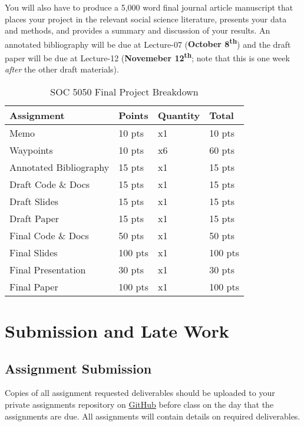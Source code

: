 \documentclass[]{book}
\theoremstyle{definition}
\theoremstyle{definition}
\theoremstyle{definition}
\theoremstyle{remark}
\begin{document}
You will also have to produce a 5,000 word final journal article
manuscript that places your project in the relevant social science
literature, presents your data and methods, and provides a summary and
discussion of your results. An annotated bibliography will be due at
Lecture-07 (\textbf{October 8\textsuperscript{th}}) and the draft paper
will be due at Lecture-12 (\textbf{Novemeber 12\textsuperscript{th}};
note that this is one week \emph{after} the other draft materials).

\begin{table}

\caption{\label{tab:unnamed-chunk-7}SOC 5050 Final Project Breakdown}
\centering
\begin{tabular}[t]{llll}
\toprule
Assignment & Points & Quantity & Total\\
\midrule
Memo & 10 pts & x1 & 10 pts\\
Waypoints & 10 pts & x6 & 60 pts\\
Annotated Bibliography & 15 pts & x1 & 15 pts\\
Draft Code \& Docs & 15 pts & x1 & 15 pts\\
Draft Slides & 15 pts & x1 & 15 pts\\
\addlinespace
Draft Paper & 15 pts & x1 & 15 pts\\
Final Code \& Docs & 50 pts & x1 & 50 pts\\
Final Slides & 100 pts & x1 & 100 pts\\
Final Presentation & 30 pts & x1 & 30 pts\\
Final Paper & 100 pts & x1 & 100 pts\\
\bottomrule
\end{tabular}
\end{table}

\section{Submission and Late Work}\label{submission-and-late-work}

\subsection{Assignment Submission}\label{assignment-submission}

Copies of all assignment requested deliverables should be uploaded to
your private assignments repository on
\href{https://github.com/slu-soc5650}{GitHub} before class on the day
that the assignments are due. All assignments will contain details on
required deliverables.
\end{document}
